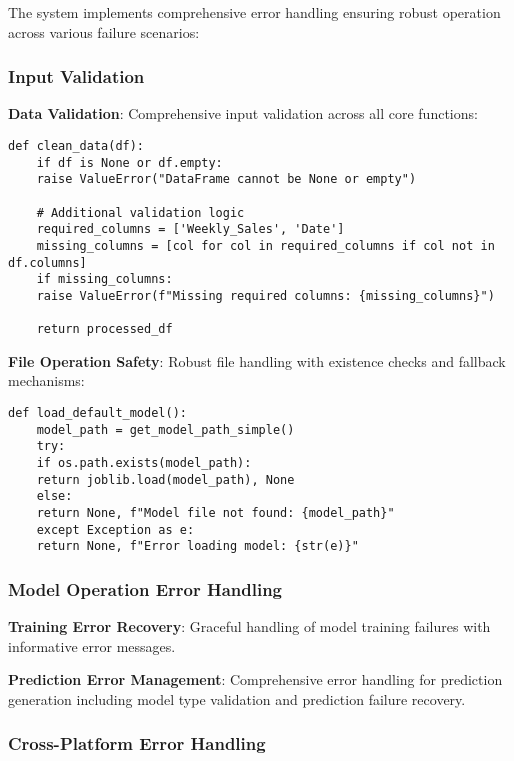 The system implements comprehensive error handling ensuring robust operation across various failure scenarios:

\subsubsection{Input Validation}

\textbf{Data Validation}: Comprehensive input validation across all core functions:

\begin{lstlisting}[language=MyPython, caption={Input Validation Example}]
	def clean_data(df):
	if df is None or df.empty:
	raise ValueError("DataFrame cannot be None or empty")
	
	# Additional validation logic
	required_columns = ['Weekly_Sales', 'Date']
	missing_columns = [col for col in required_columns if col not in df.columns]
	if missing_columns:
	raise ValueError(f"Missing required columns: {missing_columns}")
	
	return processed_df
\end{lstlisting}

\textbf{File Operation Safety}: Robust file handling with existence checks and fallback mechanisms:

\begin{lstlisting}[language=MyPython, caption={Safe File Operations}]
	def load_default_model():
	model_path = get_model_path_simple()
	try:
	if os.path.exists(model_path):
	return joblib.load(model_path), None
	else:
	return None, f"Model file not found: {model_path}"
	except Exception as e:
	return None, f"Error loading model: {str(e)}"
\end{lstlisting}

\subsubsection{Model Operation Error Handling}

\textbf{Training Error Recovery}: Graceful handling of model training failures with informative error messages.

\textbf{Prediction Error Management}: Comprehensive error handling for prediction generation including model type validation and prediction failure recovery.

\subsubsection{Cross-Platform Error Handling}


